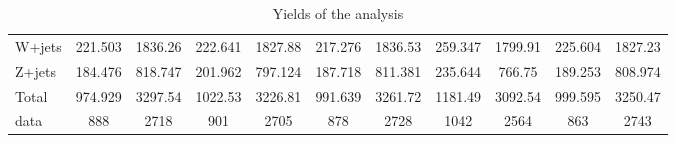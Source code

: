 \documentclass[10pt]{article}
\begin{document}
\begin{table}[htbp]
\begin{center}
\begin{tabular}{|l|S|S|S|S|S|S|S|S|S|S|}
  W+jets   & 221.503  & 1836.26  & 222.641  & 1827.88  & 217.276  & 1836.53  & 259.347  & 1799.91  & 225.604  & 1827.23  \\ 
  Z+jets   & 184.476  & 818.747  & 201.962  & 797.124  & 187.718  & 811.381  & 235.644  & 766.75  & 189.253  & 808.974  \\ 
\hline 
  Total  & 974.929  & 3297.54  & 1022.53  & 3226.81  & 991.639  & 3261.72  & 1181.49  & 3092.54  & 999.595  & 3250.47  \\ 
\hline 
  data   & 888 & 2718 & 901 & 2705 & 878 & 2728 & 1042 & 2564 & 863 & 2743 \\ 
\hline 
\end{tabular} 
\caption{Yields of the analysis} 
\end{center} 
\end{table} 
\end{document}
